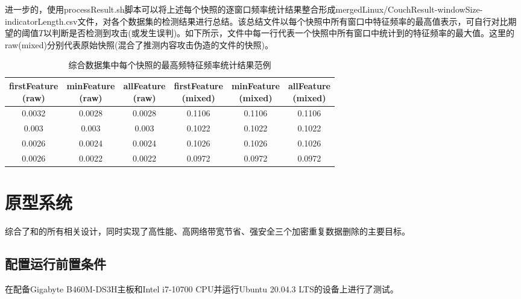 进一步的，使用processResult.sh脚本可以将上述每个快照的逐窗口频率统计结果整合形成merged{Linux/Couch}Result-{windowSize}-{indicatorLength}.csv文件，对各个数据集的检测结果进行总结。该总结文件以每个快照中所有窗口中特征频率的最高值表示，可自行对比期望的阈值$T$以判断是否检测到攻击(或发生误判)。如下所示，文件中每一行代表一个快照中所有窗口中统计到的特征频率的最大值。这里的raw(mixed)分别代表原始快照(混合了推测内容攻击伪造的文件的快照)。

\begin{table}[!htb]
  \small
  \centering
  \caption{综合数据集中每个快照的最高频特征频率统计结果范例}
  \label{tab:system-detection-snapshot}
  \begin{tabular}{cccccc}
    \toprule
    \makecell[c]{firstFeature                           \\(raw)} & \makecell[c]{minFeature\\(raw)} & \makecell[c]{allFeature\\(raw)} & \makecell[c]{firstFeature\\(mixed)} & \makecell[c]{minFeature\\(mixed)} & \makecell[c]{allFeature\\(mixed)} \\
    \midrule
    0.0032 & 0.0028 & 0.0028 & 0.1106 & 0.1106 & 0.1106 \\
    0.003  & 0.003  & 0.003  & 0.1022 & 0.1022 & 0.1022 \\
    0.0026 & 0.0024 & 0.0024 & 0.1026 & 0.1026 & 0.1026 \\
    0.0026 & 0.0022 & 0.0022 & 0.0972 & 0.0972 & 0.0972 \\
    \bottomrule
  \end{tabular}
\end{table}


\section{\prototype 原型系统}
\label{sec:appendix-prototype}
\prototype 综合了\sysnameS 和\sysnameF 的所有相关设计，同时实现了高性能、高网络带宽节省、强安全三个加密重复数据删除的主要目标。

\subsection*{配置运行前置条件}

\prototype 在配备Gigabyte B460M-DS3H主板和Intel i7-10700 CPU并运行Ubuntu 20.04.3 LTS的设备上进行了测试。

